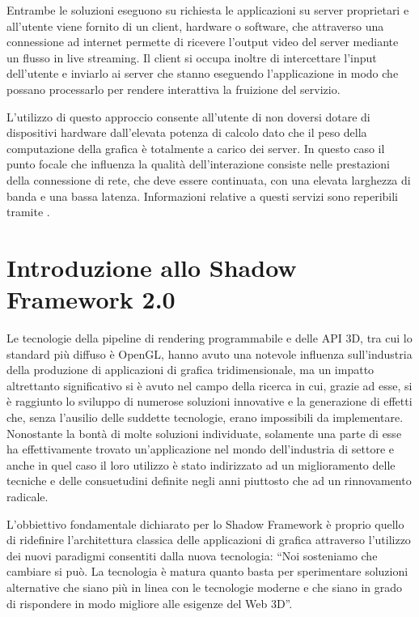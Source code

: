 Entrambe le soluzioni eseguono su richiesta le applicazioni su server proprietari e all'utente viene fornito di un client, hardware o software, che attraverso una connessione ad internet permette di ricevere l'output video del server mediante un flusso in live streaming. Il client si occupa inoltre di intercettare l'input dell'utente e inviarlo ai server che stanno eseguendo l'applicazione in modo che possano processarlo per rendere interattiva la fruizione del servizio.

L'utilizzo di questo approccio consente all'utente di non doversi dotare di dispositivi hardware dall'elevata potenza di calcolo dato che il peso della computazione della grafica \`e totalmente a carico dei server. In questo caso il punto focale che influenza la qualit\`a dell'interazione consiste nelle prestazioni della connessione di rete, che deve essere continuata, con una elevata larghezza di banda e una bassa latenza.
Informazioni relative a questi servizi sono reperibili tramite \cite{site:onlive,site:gaikai}.

\section{Introduzione allo Shadow Framework 2.0}
\label{sec:sfintro}
Le tecnologie della pipeline di rendering programmabile e delle \ac{API} 3D, tra cui lo standard pi\`u diffuso \`e OpenGL, hanno avuto una notevole influenza sull'industria della produzione di applicazioni di grafica tridimensionale, ma un impatto altrettanto significativo si \`e avuto nel campo della ricerca in cui, grazie ad esse, si \`e raggiunto lo sviluppo di numerose soluzioni innovative e la generazione di effetti che, senza l'ausilio delle suddette tecnologie, erano impossibili da implementare.
Nonostante la bont\`a di molte soluzioni individuate, solamente una parte di esse ha effettivamente trovato un'applicazione nel mondo dell'industria di settore e anche in quel caso il loro utilizzo \`e stato indirizzato ad un miglioramento delle tecniche e delle consuetudini definite negli anni piuttosto che ad un rinnovamento radicale.

L'obbiettivo fondamentale dichiarato per lo Shadow Framework \`e proprio quello di ridefinire l'architettura classica delle applicazioni di grafica attraverso l'utilizzo dei nuovi paradigmi consentiti dalla nuova tecnologia: ``Noi sosteniamo che cambiare si pu\`o. La tecnologia \`e matura quanto basta per sperimentare soluzioni alternative che siano pi\`u in linea con le tecnologie moderne e che siano in grado di rispondere in modo migliore alle esigenze del Web 3D''\cite{site:shadowframework}.

